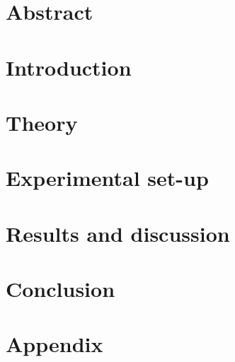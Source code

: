 \documentclass[a4paper,10pt,twoside]{report}
\author{\me}
\begin{document}


\normalsize

\chapter*{Abstract}\label{chapter:Abstract}
\setcounter{page}{0}


\tableofcontents

\chapter{Introduction}\label{chapter:Introduction}
\setcounter{page}{0}


\chapter{Theory}\label{chapter:Theory}


\chapter{Experimental set-up}\label{chapter:Experimental set-up}


\chapter{Results and discussion}\label{chapter:Results and discussion}


\chapter{Conclusion}\label{chapter:Conclusion}




\newpage

\appendix
{}
\chapter{Appendix}\label{chapter:Appendix A}

\end{document}
